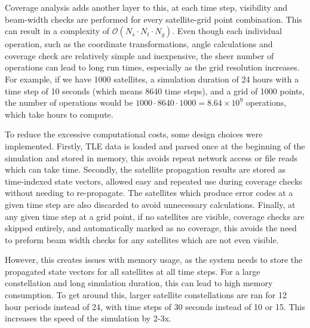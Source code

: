 Coverage analysis adds another layer to this, at each time step, visibility and beam-width checks are performed for every satellite-grid point combination. This can result in a complexity of  $\mathcal{O}(N_s \cdot N_t \cdot N_g)$. Even though each individual operation, such as the coordinate transformations, angle calculations and coverage check are relatively simple and inexpensive, the sheer number of operations can lead to long run times, especially as the grid resolution increases. For example, if we have 1000 satellites, a simulation duration of 24 hours with a time step of 10 seconds (which means 8640 time steps), and a grid of 1000 points, the number of operations would be $1000 \cdot 8640 \cdot 1000 = 8.64 \times 10^9$ operations, which take hours to compute.

To reduce the excessive computational costs, some design choices were implemented. Firstly, TLE data is loaded and parsed once at the beginning of the simulation and stored in memory, this avoids repeat network access or file reads which can take time. Secondly, the satellite propagation results are stored as time-indexed state vectors, allowed easy and repeated use during coverage checks without needing to re-propagate. The satellites which produce error codes at a given time step are also discarded to avoid unnecessary calculations. Finally, at any given time step at a grid point, if no satellites are visible, coverage checks are skipped entirely, and automatically marked as no coverage, this avoids the need to preform beam width checks for any satellites which are not even visible.   

However, this creates issues with memory usage, as the system needs to store the propagated state vectors for all satellites at all time steps. For a large constellation and long simulation duration, this can lead to high memory consumption. To get around this, larger satellite constellations are ran for 12 hour periods instead of 24, with time steps of 30 seconds instead of 10 or 15. This increases the speed of the simulation by 2-3x. 
